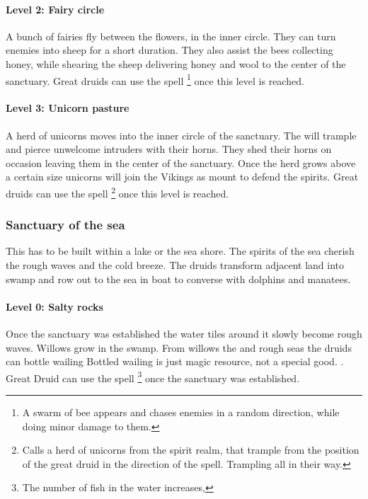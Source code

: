\documentclass[a4paper]{book}
\begin{document}
\paragraph{Level 2: Fairy circle}
A bunch of fairies fly between the flowers, in the inner circle. They can turn
enemies into sheep for a short duration. They also assist the bees collecting
honey, while shearing the sheep delivering honey and wool to the center of the
sanctuary. Great druids can use the spell \footnote{ A
	swarm of bee appears and chases enemies in a random direction, while doing
	minor damage to them. } once this level is reached.

\paragraph{Level 3: Unicorn pasture}
A herd of unicorns moves into the inner circle of the sanctuary. The will
trample and pierce unwelcome intruders with their horns. They shed their horns
on occasion leaving them in the center of the sanctuary. Once the herd grows
above a certain size unicorns will join the \gls{Vikings} as mount to defend
the spirits. Great druids can use the spell \footnote{ Calls a herd of unicorns from the spirit realm, that
	trample from the position of the great druid in the direction of the spell.
	Trampling all in their way. } once this level is reached.

\subsubsection{Sanctuary of the sea}
This has to be built within a lake or the sea shore. The spirits of the sea
cherish the rough waves and the cold breeze. The druids transform adjacent land
into swamp and row out to the sea in boat to converse with dolphins and
manatees.

\paragraph{Level 0: Salty rocks}
Once the sanctuary was established the water tiles around it slowly become
rough waves. Willows grow in the swamp. From willows the and rough seas the
druids can bottle wailing{ Bottled wailing is just magic resource, not a
		special good. }. Great Druid can use the spell \footnote{ The number of fish in the water increases, } once the
sanctuary was established.
\end{document}
